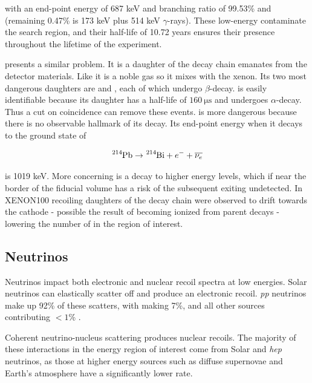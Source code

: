 \noindent with an end-point energy of 687 keV and branching ratio of 99.53\% and (remaining 0.47\% is 173 keV plus 514 keV
$\gamma$-rays).  These low-energy \betadecays
contaminate the search region, and their half-life of 10.72 years ensures their presence throughout the lifetime of the experiment.

 presents a similar problem.  It is a daughter of the  decay chain emanates from the detector materials.  Like
 it is a noble gas so it mixes with the xenon.  Its two most dangerous daughters are \leadtwofourteen and , each
of which
undergo $\beta$-decay.   is easily identifiable because its daughter \poloniumtwofourteen has a half-life of
$160\ \mathrm{\mu s}$ and undergoes $\alpha$-decay.  Thus a cut on coincidence can remove these events.  \leadtwofourteen is more
dangerous because there is no observable hallmark of its decay.  Its end-point energy when it decays to the ground state of
\bismuthtwofourteen

\begin{equation}
\ce{^{214}Pb} \rightarrow \ce{^{214}Bi} + e^{-} + \overline{\nu_{e}}
\end{equation}

\noindent is 1019 keV.  More concerning is a decay to higher energy levels, which
if near the border of the fiducial volume has a risk of the subsequent \gammaray exiting undetected.  In XENON100 recoiling daughters of
the  decay chain were observed to drift towards the cathode - possible the result of becoming ionized from parent decays
 - lowering the number of \betadecays in the region of interest.


\subsection{Neutrinos}
\label{subsec:neutrinos}
Neutrinos impact both electronic and nuclear recoil spectra at low energies.  Solar neutrinos can elastically scatter off \electron
and produce an electronic recoil.  \textit{pp} neutrinos make up 92\% of these scatters, with  making 7\%, and all other
sources contributing $<1$\% .

Coherent neutrino-nucleus scattering produces nuclear recoils.  The majority of these interactions in the energy region of interest come
from Solar 
and \textit{hep} neutrinos, as those at higher energy sources such as diffuse supernovae and Earth's atmosphere have a significantly
lower rate.

